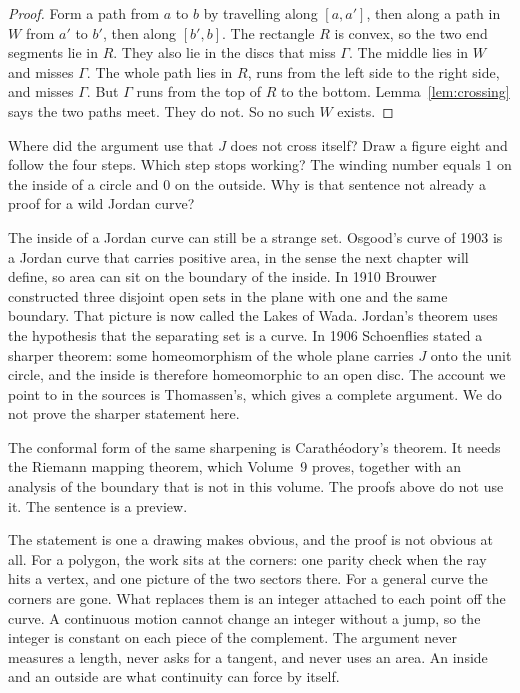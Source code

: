 \begin{proof}
Form a path from $a$ to $b$ by travelling along $[a,a']$, then along a path in $W$ from $a'$ to $b'$, then along $[b',b]$. The rectangle $R$ is convex, so the two end segments lie in $R$. They also lie in the discs that miss $\Gamma$. The middle lies in $W$ and misses $\Gamma$. The whole path lies in $R$, runs from the left side to the right side, and misses $\Gamma$. But $\Gamma$ runs from the top of $R$ to the bottom. Lemma~\ref{lem:crossing} says the two paths meet. They do not. So no such $W$ exists.
\end{proof}

\begin{think}
Where did the argument use that $J$ does not cross itself? Draw a figure eight and follow the four steps. Which step stops working? The winding number equals $1$ on the inside of a circle and $0$ on the outside. Why is that sentence not already a proof for a wild Jordan curve?
\end{think}

\begin{remark}
The inside of a Jordan curve can still be a strange set. Osgood's curve of 1903 is a Jordan curve that carries positive area, in the sense the next chapter will define, so area can sit on the boundary of the inside. In 1910 Brouwer constructed three disjoint open sets in the plane with one and the same boundary. That picture is now called the Lakes of Wada. Jordan's theorem uses the hypothesis that the separating set is a curve. In 1906 Schoenflies stated a sharper theorem: some homeomorphism of the whole plane carries $J$ onto the unit circle, and the inside is therefore homeomorphic to an open disc. The account we point to in the sources is Thomassen's, which gives a complete argument. We do not prove the sharper statement here.

The conformal form of the same sharpening is Carath\'eodory's theorem. It needs the Riemann mapping theorem, which Volume~9 proves, together with an analysis of the boundary that is not in this volume. The proofs above do not use it. The sentence is a preview.
\end{remark}

\begin{beauty}
The statement is one a drawing makes obvious, and the proof is not obvious at all. For a polygon, the work sits at the corners: one parity check when the ray hits a vertex, and one picture of the two sectors there. For a general curve the corners are gone. What replaces them is an integer attached to each point off the curve. A continuous motion cannot change an integer without a jump, so the integer is constant on each piece of the complement. The argument never measures a length, never asks for a tangent, and never uses an area. An inside and an outside are what continuity can force by itself.
\end{beauty}

